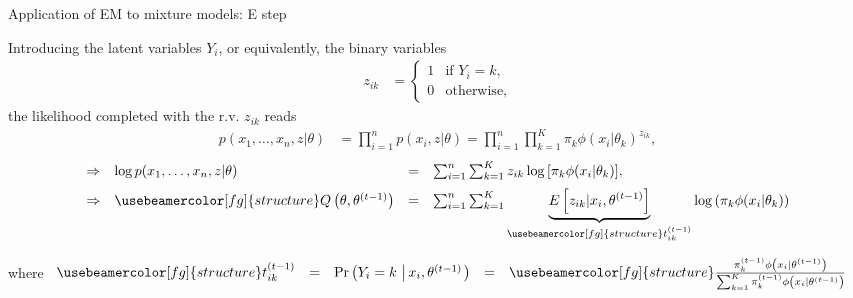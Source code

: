 \documentclass[compress, smaller, serif, 9pt]{beamer}
\newcommand{\structuretext}[1]{{\usebeamercolor[fg]{structure} #1}}
\begin{document}
\begin{frame}{Application of EM to mixture models: E step}
 
Introducing the latent variables $Y_i$, or equivalently, the binary variables
\begin{align*}
 z_{ik}&= \begin{cases}
          1 & \textrm{if } Y_i=k,\\
          0 & \textrm{otherwise},
         \end{cases}
\end{align*}
the likelihood completed with the r.v. $z_{ik}$ reads
\begin{align*}
 p(x_1,\ldots,x_n,z| \theta)&= \prod_{i=1}^n p(x_i,z|\theta)=\prod_{i=1}^n \prod_{k=1}^K \pi_k \phi(x_i|\theta_k)^{z_{ik}},  
\end{align*}
$$\begin{array}{llcl}
\Rightarrow & \log p(x_1,\ldots,x_n,z| \theta)&=& \sum_{i=1}^n \sum_{k=1}^K z_{ik} 
\log{\left[ \pi_k \phi(x_i|\theta_k) \right]},\medskip\\
\Rightarrow & \structuretext{ Q\left(\theta,\theta^{(t-1)} \right) } & = & \sum_{i=1}^n \sum_{k=1}^K 
\underbrace{E\left[ z_{ik} | x_i, \theta^{(t-1)} \right]}_{\structuretext{t_{ik}^{(t-1)}}} \log{\left( \pi_k \phi(x_i|\theta_k) \right)}
\end{array}$$

where $\begin{array}{lclcl}
\structuretext{t_{ik}^{(t-1)}}&=& \Pr\left(Y_i=k\, \left|\, x_i, \theta^{(t-1)} \right. \right)
&=& 
\structuretext{ 
\frac{  \pi_k^{(t-1)} \phi\left( x_i | \theta^{(t-1)} \right) }
{ \sum_{k=1}^K \pi_k^{(t-1)} \phi\left( x_i | \theta^{(t-1)} \right)   } 
}
\end{array}$



\end{frame}
\end{document}
